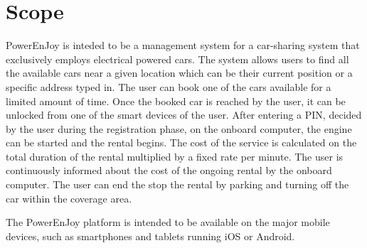 \section{Scope}
PowerEnJoy is inteded to be a management system for a car-sharing system that exclusively employs electrical powered cars.
The system allows users to find all the available cars near a given location which can be their current position or a specific address typed in. The user can book one of the cars available for a limited amount of time.
Once the booked car is reached by the user, it can be unlocked from one of the smart devices of the user. After entering a PIN, decided by the user during the registration phase, on the onboard computer, the engine can be started and the rental begins.
The cost of the service is calculated on the total duration of the rental multiplied by a fixed rate per minute. The user is continuously informed about the cost of the ongoing rental by the onboard computer.
The user can end the stop the rental by parking and turning off the car within the coverage area.

The PowerEnJoy platform is intended to be available on the major mobile devices, such as smartphones and tablets running iOS or Android.